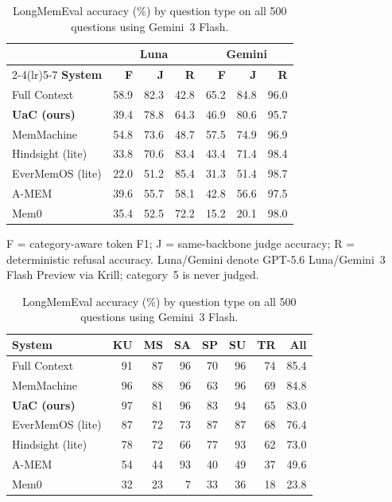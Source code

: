 \begin{table}[t]
\begin{minipage}[t]{0.505\textwidth}
\centering
\caption{Full LOCOMO results (\%) on all 1{,}986 questions. F/J use 1{,}540 answer-bearing questions; R uses 446 adversarial questions.}
\label{tab:locomo}
\scriptsize
\setlength{\tabcolsep}{1.7pt}
\begin{tabular}{@{}lrrrrrr@{}}
\toprule
 & \multicolumn{3}{c}{\textbf{Luna}} & \multicolumn{3}{c}{\textbf{Gemini}} \\
\cmidrule(lr){2-4}\cmidrule(lr){5-7}
\textbf{System} & \textbf{F} & \textbf{J} & \textbf{R} & \textbf{F} & \textbf{J} & \textbf{R} \\
\midrule
Full Context       & 58.9 & 82.3 & 42.8 & 65.2 & 84.8 & 96.0 \\
\textbf{UaC (ours)} & 39.4 & 78.8 & 64.3 & 46.9 & 80.6 & 95.7 \\
MemMachine         & 54.8 & 73.6 & 48.7 & 57.5 & 74.9 & 96.9 \\
Hindsight (lite)   & 33.8 & 70.6 & 83.4 & 43.4 & 71.4 & 98.4 \\
EverMemOS (lite)   & 22.0 & 51.2 & 85.4 & 31.3 & 51.4 & 98.7 \\
A-MEM              & 39.6 & 55.7 & 58.1 & 42.8 & 56.6 & 97.5 \\
Mem0               & 35.4 & 52.5 & 72.2 & 15.2 & 20.1 & 98.0 \\
\bottomrule
\end{tabular}

\vspace{2pt}
\raggedright F = category-aware token F1; J = same-backbone judge accuracy; R = deterministic refusal accuracy. Luna/Gemini denote GPT-5.6 Luna/Gemini~3 Flash Preview via Krill; category~5 is never judged.\par
\end{minipage}
\hfill
\begin{minipage}[t]{0.475\textwidth}
\centering
\caption{LongMemEval accuracy (\%) by question type on all 500 questions using Gemini~3 Flash.}
\label{tab:longmemeval}
\scriptsize
\setlength{\tabcolsep}{1.8pt}
\begin{tabular}{@{}lrrrrrrr@{}}
\toprule
\textbf{System} & \textbf{KU} & \textbf{MS} & \textbf{SA} & \textbf{SP} & \textbf{SU} & \textbf{TR} & \textbf{All} \\
\midrule
Full Context     & 91 & 87 & 96 & 70 & 96 & 74 & 85.4 \\
MemMachine       & 96 & 88 & 96 & 63 & 96 & 69 & 84.8 \\
\textbf{UaC (ours)} & 97 & 81 & 96 & 83 & 94 & 65 & 83.0 \\
EverMemOS (lite) & 87 & 72 & 73 & 87 & 87 & 68 & 76.4 \\
Hindsight (lite) & 78 & 72 & 66 & 77 & 93 & 62 & 73.0 \\
A-MEM            & 54 & 44 & 93 & 40 & 49 & 37 & 49.6 \\
Mem0             & 32 & 23 &  7 & 33 & 36 & 18 & 23.8 \\
\bottomrule
\end{tabular}


\end{minipage}
\end{table}
